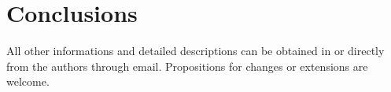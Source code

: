 \section{Conclusions}
\label{Conclusions}
All other informations and detailed descriptions can be obtained in \cite{dinosoars2015} or directly from the authors through email. Propositions for changes or extensions are welcome. 
